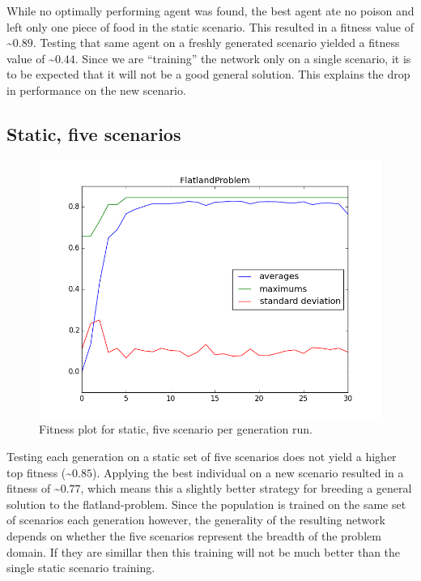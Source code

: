 \documentclass[twoside]{article}
\begin{document}
\begin{multicols}{2}
  While no optimally performing agent was found,
  the best agent ate no poison and left only one piece of food in the static scenario.
  This resulted in a fitness value of \textasciitilde $0.89$.
  Testing that same agent on a freshly generated scenario yielded a fitness value of \textasciitilde $0.44$.
  Since we are ``training'' the network only on a single scenario,
  it is to be expected that it will not be a good general solution.
  This explains the drop in performance on the new scenario.
  
  \subsection{Static, five scenarios}

  \begin{figure}[H]
    \centering
    \includegraphics[width=\linewidth]{images/static_5.png}
    \caption{Fitness plot for static, five scenario per generation run.} \label{fig:static-single}
  \end{figure}

  Testing each generation on a static set of five scenarios does not yield a higher top fitness (\textasciitilde $0.85$).
  Applying the best individual on a new scenario resulted in a fitness of \textasciitilde $0.77$, which means this a slightly better strategy for breeding a general solution to the flatland-problem.
  Since the population is trained on the same set of scenarios each generation however,
  the generality of the resulting network depends on whether the five scenarios represent the breadth of the problem domain.
  If they are simillar then this training will not be much better than the single static scenario training.


\end{multicols}
\end{document}
